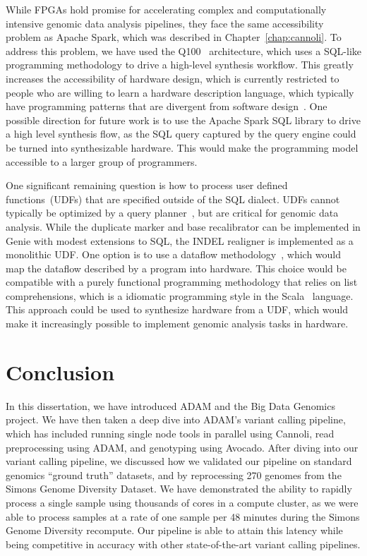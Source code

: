 \documentclass[phd]{ucbthesis}
\begin{document}
While FPGAs hold promise for accelerating complex and computationally intensive
genomic data analysis pipelines, they face the same accessibility problem
as {Apache Spark}, which was described in Chapter~\ref{chap:cannoli}. To
address this problem, we have used the Q100~\cite{wu14} architecture, which uses
a SQL-like programming methodology to drive a high-level synthesis workflow.
This greatly increases the accessibility of hardware design, which is currently
restricted to people who are willing to learn a hardware description language,
which typically have programming patterns that are divergent from software
design~\cite{bachrach12}. One possible direction for future work is to use the
{Apache Spark SQL} library to drive a high level synthesis flow, as the
SQL query captured by the query engine could be turned into synthesizable
hardware. This would make the programming model accessible to a larger group of
programmers.

One significant remaining question is how to process user defined
functions~(UDFs) that are specified outside of the SQL dialect. UDFs cannot
typically be optimized by a query planner~\cite{armbrust15, kornacker15}, but
are critical for genomic data analysis. While the duplicate marker and base
recalibrator can be implemented in {Genie} with modest extensions to SQL,
the INDEL realigner is implemented as a monolithic UDF. One option is to use a
dataflow methodology~\cite{bhattacharyya08}, which would map the dataflow
described by a program into hardware. This choice would be compatible with a purely
functional programming methodology that relies on list comprehensions, which is
a idiomatic programming style in the {Scala}~\cite{odersky04} language.
This approach could be used to synthesize hardware from a UDF, which would make
it increasingly possible to implement genomic analysis tasks in hardware.

\chapter{Conclusion}
\label{chap:conclusion}

In this dissertation, we have introduced ADAM and the Big Data Genomics project.
We have then taken a deep dive into ADAM's variant calling pipeline, which has
included running single node tools in parallel using Cannoli, read preprocessing
using ADAM, and genotyping using Avocado. After diving into our variant calling
pipeline, we discussed how we validated our pipeline on standard genomics
``ground truth'' datasets, and by reprocessing 270 genomes from the Simons
Genome Diversity Dataset. We have demonstrated the ability to rapidly process
a single sample using thousands of cores in a compute cluster, as we were able
to process samples at a rate of one sample per 48 minutes during the Simons
Genome Diversity recompute. Our pipeline is able to attain this latency while
being competitive in accuracy with other state-of-the-art variant calling
pipelines.
\end{document}
